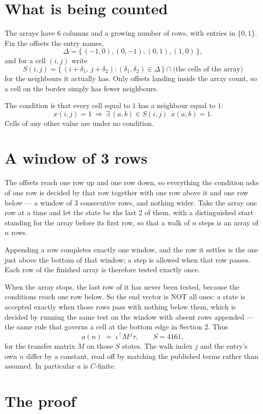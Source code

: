 \documentclass[11pt,a4paper]{article}
\theoremstyle{plain}
\theoremstyle{definition}
\begin{document}
\section{What is being counted}

The arrays have $6$ columns and a growing number of rows, with entries in $\{0,1\}$. Fix the
offsets the entry names,
\[
\Delta=\{\,(-1,0), (0,-1), (0,1), (1,0)\,\},
\]
and for a cell $(i,j)$ write
\[
S(i,j)=\{\,(i+\delta_1,\,j+\delta_2) : (\delta_1,\delta_2)\in\Delta\,\}\cap
\text{(the cells of the array)}
\]
for the neighbours it actually has. Only offsets landing inside the array count, so a cell on
the border simply has fewer neighbours.

The condition is that every cell equal to $1$ has a neighbour equal to $1$:
\[
x(i,j)=1\ \Longrightarrow\ \exists\,(a,b)\in S(i,j)\ \ x(a,b)=1 .
\]
Cells of any other value are under no condition.

\section{A window of 3 rows}

The offsets reach one row up and one row down, so everything the condition asks of one row is
decided by that row together with one row above it and one row below --- a window of
$3$ consecutive rows, and nothing wider. Take the array one row at a time and
let the state be the last 2 of them, with a distinguished start standing for the array before its
first row, so that a walk of $n$ steps is an array of $n$ rows.

Appending a row completes exactly one window, and the row it settles is the one just above the bottom of that window; a step is
allowed when that row passes. Each row of the finished array is therefore tested exactly once.

When the array stops, the last row of it has never been tested, because the
conditions reach one row below. So the end vector is NOT all ones: a state is accepted exactly when
those rows pass with nothing below them, which is decided by running the same test on the window
with absent rows appended --- the same rule that governs a cell at the bottom edge in
Section 2.
Thus
\[
a(n)\;=\;\iota^{\!\top}M^{\,j}\tau ,\qquad S=4161,
\]
for the transfer matrix $M$ on those $S$ states. The walk index $j$ and the entry's own $n$
differ by a constant, read off by matching the published terms rather than assumed. In
particular $a$ is $C$-finite.

\section{The proof}
\end{document}
